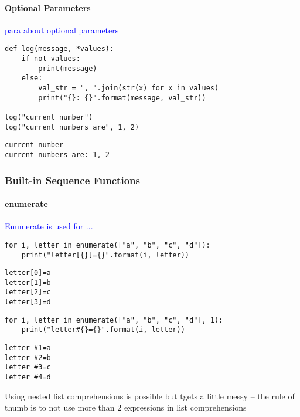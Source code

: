 \paragraph{Optional Parameters}

\textcolor{blue}{para about optional parameters}

\begin{lstlisting}[style=pyInStyle]
def log(message, *values):
    if not values:
        print(message)
    else:
        val_str = ", ".join(str(x) for x in values)
        print("{}: {}".format(message, val_str))

log("current number")
log("current numbers are", 1, 2)
\end{lstlisting}
\begin{lstlisting}[style=pyOutStyle]
current number
current numbers are: 1, 2
\end{lstlisting}

\subsubsection{Built-in Sequence Functions}

\paragraph{enumerate}

\textcolor{blue}{Enumerate is used for ...}

\begin{lstlisting}[style=pyInStyle]
for i, letter in enumerate(["a", "b", "c", "d"]):
    print("letter[{}]={}".format(i, letter))
\end{lstlisting}
\begin{lstlisting}[style=pyOutStyle]
letter[0]=a
letter[1]=b
letter[2]=c
letter[3]=d
\end{lstlisting}


\begin{lstlisting}[style=pyInStyle]
for i, letter in enumerate(["a", "b", "c", "d"], 1):
    print("letter#{}={}".format(i, letter))
\end{lstlisting}
\begin{lstlisting}[style=pyOutStyle]
letter #1=a
letter #2=b
letter #3=c
letter #4=d
\end{lstlisting}
\begin{markdown}
Using nested list comprehensions is possible but tgets a little messy -- the rule of thumb is to not use more than 2 expressions in list comprehensions
\end{markdown}


